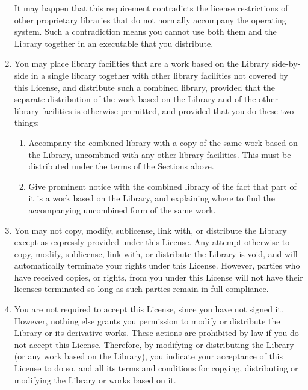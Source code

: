 \documentclass[12pt]{report}
\begin{document}
\begin{enumerate}
It may happen that this requirement contradicts the license restrictions
of other proprietary libraries that do not normally accompany the
operating system.  Such a contradiction means you cannot use both them and
the Library together in an executable that you distribute.

\item

You may place library facilities that are a work based on the Library
side-by-side in a single library together with other library facilities
not covered by this License, and distribute such a combined library,
provided that the separate distribution of the work based on the Library
and of the other library facilities is otherwise permitted, and provided
that you do these two things:

\begin{enumerate}

   \item

     Accompany the combined library with a copy of the same work based on
     the Library, uncombined with any other library facilities.  This must
     be distributed under the terms of the Sections above.

   \item

     Give prominent notice with the combined library of the fact that part
     of it is a work based on the Library, and explaining where to find
     the accompanying uncombined form of the same work.
\end{enumerate}

\item

  You may not copy, modify, sublicense, link with, or distribute the
  Library except as expressly provided under this License.  Any attempt
  otherwise to copy, modify, sublicense, link with, or distribute the
  Library is void, and will automatically terminate your rights under this
  License.  However, parties who have received copies, or rights, from you
  under this License will not have their licenses terminated so long as
  such parties remain in full compliance.

\item  

  You are not required to accept this License, since you have not signed
  it.  However, nothing else grants you permission to modify or distribute
  the Library or its derivative works.  These actions are prohibited by
  law if you do not accept this License.  Therefore, by modifying or
  distributing the Library (or any work based on the Library), you
  indicate your acceptance of this License to do so, and all its terms and
  conditions for copying, distributing or modifying the Library or works
  based on it.


\end{enumerate}
\end{document}
